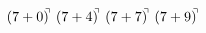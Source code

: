 \documentclass[preview]{standalone}
\begin{document}
\begin{align*}
(7+0)^{\hspace{-0.1cm}\urcorner} \ (7+4)^{\hspace{-0.1cm}\urcorner} \ (7+7)^{\hspace{-0.1cm}\urcorner} \ (7+9)^{\hspace{-0.1cm}\urcorner}
\end{align*}
\end{document}
